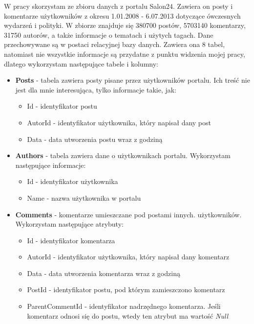 \documentclass[polish,12pt]{aghthesis}
\begin{document}
W pracy skorzystam ze zbioru danych z portalu Salon24. Zawiera on posty i komentarze użytkowników z okresu 1.01.2008 - 6.07.2013 dotyczące
ówczesnych wydarzeń i polityki. W zbiorze znajduje się 380700 postów, 5703140 komentarzy, 31750 autorów, a także informacje o tematach i użytych tagach. Dane przechowywane są w postaci relacyjnej bazy danych. Zawiera ona 8 tabel, natomiast nie wszystkie informacje są przydatne z punktu widzenia mojej pracy, dlatego wykorzystam następujące tabele i kolumny:
\begin{itemize}
    \item \textbf{Posts} - tabela zawiera posty pisane przez użytkowników portalu. Ich treść nie jest dla mnie interesująca, tylko informacje takie, jak:
        \begin{itemize}
            \item Id - identyfikator postu
            \item AutorId - identyfikator użytkownika, który napisał dany post
            \item Data - data utworzenia postu wraz z godziną

        \end{itemize}
    \item \textbf{Authors} - tabela zawiera dane o użytkownikach portalu. Wykorzystam następujące informacje:
    \begin{itemize}
            \item Id - identyfikator użytkownika
            \item Name - nazwa użytkownika w portalu

        \end{itemize}
    
    \item \textbf{Comments} - komentarze umieszczane pod postami innych. użytkowników. Wykorzystam następujące atrybuty:
    \begin{itemize}
            \item Id - identyfikator komentarza
            \item AutorId - identyfikator użytkownika, który napisał dany komentarz
            \item Data - data utworzenia komentarza wraz z godziną
            \item PostId - identyfikator postu, pod którym zamieszczono komentarz
            \item ParentCommentId - identyfikator nadrzędnego komentarza. Jeśli komentarz odnosi się do postu, wtedy ten atrybut ma wartość \textit{Null}
        \end{itemize}
\end{itemize}
\end{document}
